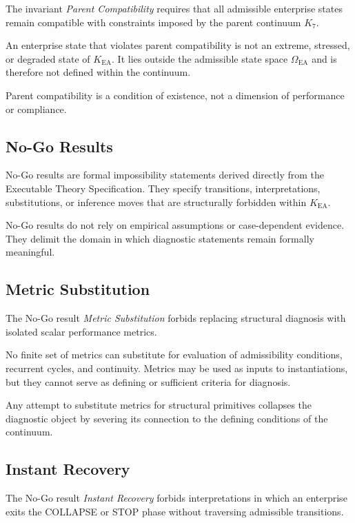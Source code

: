 The invariant \emph{Parent Compatibility} requires that all admissible
enterprise states remain compatible with constraints imposed by the
parent continuum $K_7$.

An enterprise state that violates parent compatibility is not an
extreme, stressed, or degraded state of $K_{\mathrm{EA}}$.
It lies outside the admissible state space $\Omega_{\mathrm{EA}}$ and is
therefore not defined within the continuum.

Parent compatibility is a condition of existence, not a dimension of
performance or compliance.

\subsection{No-Go Results}

No-Go results are formal impossibility statements derived directly from
the Executable Theory Specification.
They specify transitions, interpretations, substitutions, or inference
moves that are structurally forbidden within $K_{\mathrm{EA}}$.

No-Go results do not rely on empirical assumptions or case-dependent
evidence.
They delimit the domain in which diagnostic statements remain formally
meaningful.

\subsection{Metric Substitution}

The No-Go result \emph{Metric Substitution} forbids replacing structural
diagnosis with isolated scalar performance metrics.

No finite set of metrics can substitute for evaluation of admissibility
conditions, recurrent cycles, and continuity.
Metrics may be used as inputs to instantiations, but they cannot serve
as defining or sufficient criteria for diagnosis.

Any attempt to substitute metrics for structural primitives collapses
the diagnostic object by severing its connection to the defining
conditions of the continuum.

\subsection{Instant Recovery}

The No-Go result \emph{Instant Recovery} forbids interpretations in which
an enterprise exits the COLLAPSE or STOP phase without traversing
admissible transitions.

